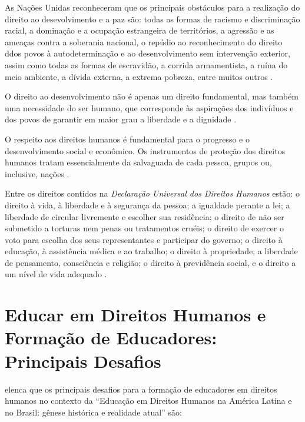 \documentclass[
	article,			%
	11pt,				%
	oneside,			%
	a4paper,			%
	english,			%
	brazil,				%
	sumario=tradicional
]{abntex2}
\begin{document}
As Nações Unidas reconheceram que os principais obstáculos para a realização do
direito ao desevolvimento e a paz são: todas as formas de racismo e
discriminação racial, a dominação e a ocupação estrangeira de territórios, a
agressão e as ameaças contra a soberania nacional, o repúdio ao reconhecimento
do direito ddos povos à autodeterminação e ao desenvolvimento sem intervenção
exterior, assim como todas as formas de escravidão, a corrida armamentista,
a ruína do meio ambiente, a dívida externa, a extrema pobreza, entre muitos
outros \cite{EducacaoDireitosHumanos}.

\noindent
O direito ao desenvolvimento não é apenas um direito fundamental, mas também uma
necessidade do ser humano, que corresponde às aspirações dos indivíduos e dos
povos de garantir em maior grau a liberdade e a dignidade
\cite{EducacaoDireitosHumanos}.

\noindent
O respeito aos direitos humanos é fundamental para o progresso e o
desenvolvimento social e econômico. Os instrumentos de proteção dos direitos
humanos tratam essencialmente da salvaguada de cada pessoa, grupos ou,
inclusive, nações \cite{EducacaoDireitosHumanos}.

\noindent
Entre os direitos contidos na \textit{Declaração Universal dos Direitos Humanos}
estão: o direito à vida, à liberdade e à segurança da pessoa; a igualdade
perante a lei; a liberdade de circular livremente e escolher sua residência; o
direito de não ser submetido a torturas nem penas ou tratamentos cruéis; o
direito de exercer o voto para escolha dos seus representantes e participar do
governo; o direito à educação, à assistência médica e ao trabalho; o direito à
propriedade; a liberdade de pensamento, consciência e religião; o direito à
previdência social, e o direito a um nível de vida adequado
\cite{DeclaracaoDireitosHumanos}.


\section{Educar em Direitos Humanos e Formação de Educadores: Principais
Desafios}

 elenca que os principais
desafios para a formação de educadores em direitos humanos no contexto da 
``Educação em Direitos Humanos na América Latina e no Brasil: gênese histórica
e realidade atual'' são:
\end{document}
